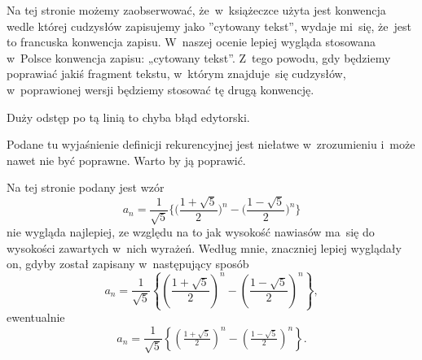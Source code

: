 \documentclass[a4paper,11pt]{article}
\begin{document}
\vspace{\spaceFour}





 Na tej stronie możemy zaobserwować, że~w~książeczce użyta jest
konwencja wedle której cudzysłów zapisujemy jako ”cytowany tekst”, wydaje
mi~się, że~jest to francuska konwencja zapisu. W~naszej ocenie lepiej
wygląda stosowana w~Polsce konwencja zapisu: „cytowany tekst”. Z~tego
powodu, gdy będziemy poprawiać jakiś fragment tekstu, w~którym znajduje~się
cudzysłów, w~poprawionej wersji będziemy stosować tę drugą konwencję.

\vspace{\spaceFour}





 Duży odstęp po tą linią to chyba błąd edytorski.

\vspace{\spaceFour}





 Podane tu wyjaśnienie definicji rekurencyjnej jest niełatwe
w~zrozumieniu i~może nawet nie być poprawne. Warto by ją poprawić.

\vspace{\spaceFour}





 Na tej stronie podany jest wzór
\begin{equation}
  \label{eq:Gancarzewicz-Arytmetyka-01}
  a_{ n } =
  \frac{ 1 }{ \sqrt{ 5 } }
  \Big\{ \Big( \frac{ 1 + \sqrt{ 5 } }{ 2 } \Big)^{ n }
  - \Big( \frac{ 1 - \sqrt{5} }{ 2 } \Big)^{ n } \Big\}
\end{equation}
nie wygląda najlepiej, ze względu na to jak wysokość nawiasów ma~się
do wysokości zawartych w~nich wyrażeń. Według mnie, znaczniej lepiej
wyglądały on, gdyby został zapisany w~następujący sposób
\begin{equation}
  \label{eq:Gancarzewicz-Arytmetyka-01}
  a_{ n } =
  \frac{ 1 }{ \sqrt{ 5 } }
  \left\{ \left( \frac{ 1 + \sqrt{ 5 } }{ 2 } \right)^{ n }
  - \left( \frac{ 1 - \sqrt{5} }{ 2 } \right)^{ n } \right\},
\end{equation}
ewentualnie
\begin{equation}
  \label{eq:Gancarzewicz-Arytmetyka-02}
  a_{ n } =
  \frac{ 1 }{ \sqrt{ 5 } }
  \left\{ \left( \tfrac{ 1 + \sqrt{ 5 } }{ 2 } \right)^{ n }
  - \left( \tfrac{ 1 - \sqrt{5} }{ 2 } \right)^{ n } \right\}.
\end{equation}
\end{document}
